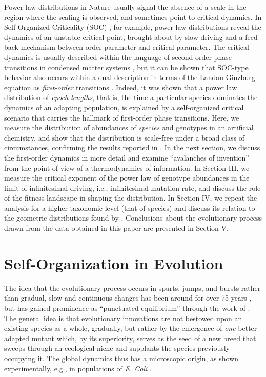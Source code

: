 \documentclass[letterpaper]{article}
\begin{document}
Power law distributions in Nature usually signal the absence of a
scale in the region where the scaling is observed, and sometimes point
to critical dynamics. In Self-Organized-Criticality (SOC)
\citep{BTW87,BTW88}, for example, power law distributions reveal the
dynamics of an unstable critical point, brought about by slow driving
and a feed-back mechanism between order parameter and critical
parameter.  The critical dynamics is usually described within the
language of second-order phase transitions in condensed matter systems
\citep{SJD}, but it can be shown that SOC-type behavior also occurs
within a dual description in terms of the Landau-Ginzburg equation as
{\em first-order} transitions \citep{GS}.  Indeed, it was shown that a
power law distribution of {\em epoch-lengths}, that is, the time a
particular species dominates the dynamics of an adapting population,
is explained by a self-organized critical scenario \citep{CA2} that
carries the hallmark of first-order phase transitions. Here, we
measure the distribution of abundances of {\em species} and genotypes
in an artificial chemistry, \citep[the Avida Artificial Life
system][]{AB1,OBA} and show that the distribution is scale-free under
a broad class of circumstances, confirming the results reported in
\citep{CA2}.  In the next section, we discuss the first-order dynamics
in more detail and examine ``avalanches of invention'' from the point
of view of a thermodynamics of information. In Section III, we measure
the critical exponent of the power law of genotype abundances in the
limit of infinitesimal driving, i.e., infinitesimal mutation rate, and
discuss the role of the fitness landscape in shaping the
distribution. In Section IV, we repeat the analysis for a higher
taxonomic level (that of species) and discuss its relation to the
geometric distributions found by \citet{BUR90,BUR93}.
Conclusions about the evolutionary process drawn from the data
obtained in this paper are presented in Section V.

\section{Self-Organization in Evolution}

The idea that the evolutionary process occurs in spurts, jumps, and
bursts rather than gradual, slow and continuous changes has been
around for over 75 years \citep{WIL}, but has gained prominence as
``punctuated equilibrium'' through the work of \citet{GE77,GE93}. The
general idea is that evolutionary innovations are not bestowed upon an
existing species as a whole, gradually, but rather by the emergence of
{\em one} better adapted mutant which, by its superiority, serves as
the seed of a new breed that sweeps through an ecological niche and
supplants the species previously occupying it. The global dynamics
thus has a microscopic origin, as shown experimentally, e.g., in
populations of {\it E. Coli} \citep{ECL96}.
\end{document}
